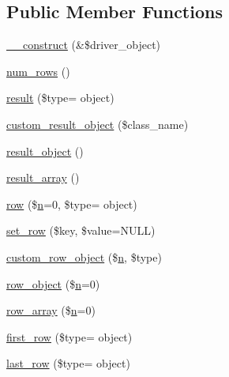 \subsection*{Public Member Functions}
\begin{DoxyCompactItemize}
\item 
\hyperlink{class_c_i___d_b__result_a8e093c8b6e5733bc3f306385ee426ab7}{\+\_\+\+\_\+construct} (\&\$driver\+\_\+object)
\item 
\hyperlink{class_c_i___d_b__result_a218657c303ee499b97710ab0cd2f5d6e}{num\+\_\+rows} ()
\item 
\hyperlink{class_c_i___d_b__result_a00c60026ca0f661ad05ccbea453e2a70}{result} (\$type= \textquotesingle{}object\textquotesingle{})
\item 
\hyperlink{class_c_i___d_b__result_a5ac3523f878efb629fae30a7d9156e77}{custom\+\_\+result\+\_\+object} (\$class\+\_\+name)
\item 
\hyperlink{class_c_i___d_b__result_a266a17f340dab35b8f2858931ff772a2}{result\+\_\+object} ()
\item 
\hyperlink{class_c_i___d_b__result_a444f7dd61bfbe3931a7188adad61feae}{result\+\_\+array} ()
\item 
\hyperlink{class_c_i___d_b__result_ae24a9cbcd70e2e547fbb1465ad35c597}{row} (\$\hyperlink{cli_2error__general_8php_ace0fd03cd383f20ce6ea63247a207294}{n}=0, \$type= \textquotesingle{}object\textquotesingle{})
\item 
\hyperlink{class_c_i___d_b__result_a77628e90fac65184ec9f583e7c30a48a}{set\+\_\+row} (\$key, \$value=N\+U\+L\+L)
\item 
\hyperlink{class_c_i___d_b__result_a223538c34395626655fd483f3a55e653}{custom\+\_\+row\+\_\+object} (\$\hyperlink{cli_2error__general_8php_ace0fd03cd383f20ce6ea63247a207294}{n}, \$type)
\item 
\hyperlink{class_c_i___d_b__result_a0bd3520c57f5cb192bdfaeed1f597c0a}{row\+\_\+object} (\$\hyperlink{cli_2error__general_8php_ace0fd03cd383f20ce6ea63247a207294}{n}=0)
\item 
\hyperlink{class_c_i___d_b__result_a8dbff471ffdaf617d49189f8636e4f81}{row\+\_\+array} (\$\hyperlink{cli_2error__general_8php_ace0fd03cd383f20ce6ea63247a207294}{n}=0)
\item 
\hyperlink{class_c_i___d_b__result_ab17d02e3b1f6d64f9cff8392b90775db}{first\+\_\+row} (\$type= \textquotesingle{}object\textquotesingle{})
\item 
\hyperlink{class_c_i___d_b__result_a40968b12597461279cc2f7b3653d01fb}{last\+\_\+row} (\$type= \textquotesingle{}object\textquotesingle{})

\end{DoxyCompactItemize}
